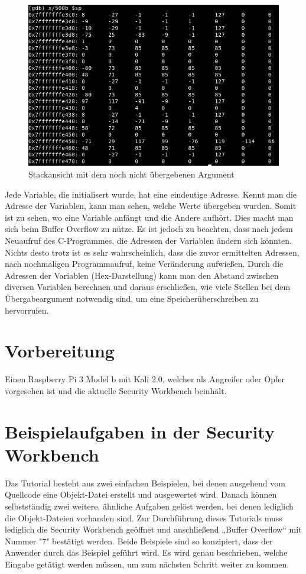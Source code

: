     \begin{figure}[H]
		\centering
		\includegraphics[width=1.0\textwidth]{images/bufferPics/Buffer1.png}
		\caption{Stackansicht mit dem noch nicht übergebenen Argument}
	\end{figure}
Jede Variable, die initialisert wurde, hat eine eindeutige Adresse. Kennt man die Adresse der Variablen, kann man sehen, welche Werte übergeben wurden. Somit ist zu sehen, wo eine Variable anfängt und die Andere aufhört. Dies macht man sich beim Buffer Overflow zu nütze. Es ist jedoch zu beachten, dass nach jedem Neuaufruf des C-Programmes, die Adressen der Variablen ändern sich könnten. Nichts desto trotz ist es sehr wahrscheinlich, dass die zuvor ermittelten Adressen, nach nochmaligen Programmaufruf, keine Veränderung aufwießen. 
Durch die Adressen der Variablen (Hex-Darstellung) kann man den Abstand zwischen diversen Variablen berechnen und daraus erschließen, wie viele Stellen bei dem Übergabeargument notwendig sind, um eine Speicherüberschreiben zu hervorrufen. 

\section{Vorbereitung}
Einen Raspberry Pi 3 Model b mit Kali 2.0, welcher als Angreifer oder Opfer vorgesehen ist und die aktuelle Security Workbench beinhält.

\section{Beispielaufgaben in der Security Workbench}
Das Tutorial besteht aus zwei einfachen Beispielen, bei denen ausgehend vom Quellcode eine Objekt-Datei erstellt und ausgewertet wird. Danach können selbstständig zwei weitere, ähnliche Aufgaben gelöst werden, bei denen lediglich die Objekt-Dateien vorhanden sind. Zur Durchführung dieses Tutorials muss lediglich die Security Workbench geöffnet und anschließend „Buffer Overflow“ mit Nummer "7" bestätigt werden. Beide Beispiele sind so konzipiert, dass der Anwender durch das Beispiel geführt wird. Es wird genau beschrieben, welche Eingabe getätigt werden müssen, um zum nächsten Schritt weiter zu kommen. 

